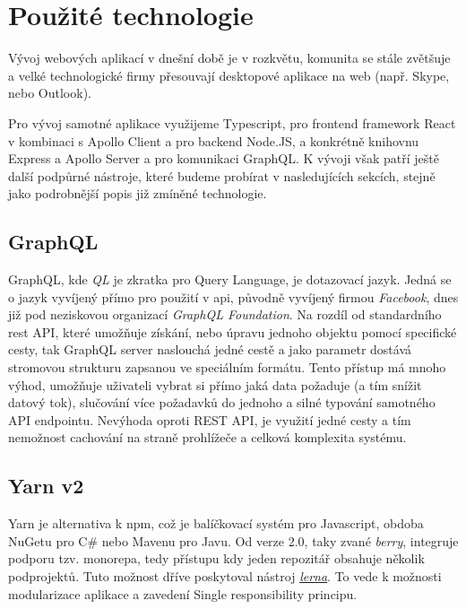 \section{Použité technologie}
\label{sc:used_techologies}
Vývoj webových aplikací v dnešní době je v rozkvětu, komunita se stále zvětšuje a velké technologické firmy přesouvají desktopové aplikace na web (např. Skype, nebo Outlook).

Pro vývoj samotné aplikace využijeme Typescript, pro frontend framework React v kombinaci s Apollo Client a pro backend Node.JS, a konkrétně knihovnu Express a Apollo Server a pro komunikaci GraphQL. K vývoji však patří ještě další podpůrné nástroje, které budeme probírat v nasledujících sekcích, stejně jako podrobnější popis již zmíněné technologie.

\subsection{GraphQL}
\label{ss:graphql}
GraphQL, kde \emph{QL} je zkratka pro Query Language, je dotazovací jazyk. Jedná se o jazyk vyvíjený přímo pro použití v \acrshort{api}, původně vyvíjený firmou \emph{Facebook}, dnes již pod neziskovou organizací \emph{GraphQL Foundation}. Na rozdíl od standardního \acrshort{rest} API, které umožňuje získání, nebo úpravu jednoho objektu pomocí specifické cesty, tak GraphQL server naslouchá jedné cestě a jako parametr dostává stromovou strukturu zapsanou ve speciálním formátu. Tento přístup má mnoho výhod, umožňuje uživateli vybrat si přímo jaká data požaduje (a tím snížit datový tok), slučování více požadavků do jednoho a silné typování samotného API endpointu. Nevýhoda oproti REST API, je využití jedné cesty a tím nemožnost cachování na straně prohlížeče a celková komplexita systému.

\subsection{Yarn v2}
\label{ss:yarn}
Yarn je alternativa k \acrshort{npm}, což je balíčkovací systém pro Javascript, obdoba NuGetu pro C\# nebo Mavenu pro Javu. Od verze 2.0, taky zvané \emph{berry}, integruje podporu tzv. monorepa, tedy přístupu kdy jeden repozitář obsahuje několik podprojektů. Tuto možnost dříve poskytoval nástroj \href{https://github.com/lerna/lerna}{\emph{lerna}}. To vede k možnosti modularizace aplikace a zavedení Single responsibility principu.


